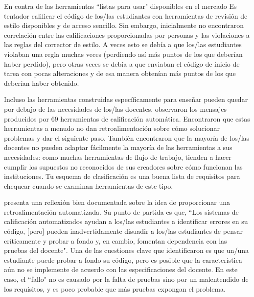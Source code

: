 \begin{aside}{En contra de las herramientas ``listas para usar" disponibles en el mercado}
Es tentador calificar el código de los/las estudiantes con herramientas de revisión de estilo disponibles y de acceso sencillo.
Sin embargo,
\cite{Nutb2016} inicialmente no encontraron correlación entre las calificaciones proporcionadas por personas 
y las violaciones a las reglas del corrector de estilo.
A veces esto se debía a que los/las estudiantes violaban una regla muchas veces 
(perdiendo así más puntos de los que deberían haber perdido), 
pero otras veces se debía a que enviaban el código de inicio de tarea con pocas alteraciones y de esa manera obtenían más puntos de los que deberían haber obtenido.

 Incluso las herramientas construidas específicamente para enseñar pueden quedar por debajo de las necesidades de los/las docentes.
   \cite{Keun2016a,Keun2016b} observaron los mensajes producidos por 69 herramientas de calificación automática.
  Encontraron que estas herramientas a menudo no dan retroalimentación sobre cómo solucionar problemas y dar el siguiente paso.
    También encontraron que la mayoría de los/las docentes no pueden adaptar fácilmente la mayoría de las herramientas a sus necesidades: 
como muchas herramientas de flujo de trabajo, tienden a hacer cumplir los supuestos no reconocidos de sus creadores sobre cómo funcionan las instituciones.
  Tu esquema de clasificación es una buena lista de requisitos para chequear cuando se examinan herramientas de este tipo.
\end{aside}

\cite{Buff2015} presenta una reflexión bien documentada sobre la idea de proporcionar una retroalimentación automatizada.
Su punto de partida es que, 
``Los sistemas de calificación automatizados ayudan a los/las estudiantes a identificar errores en su código, 
[pero] pueden inadvertidamente disuadir a los/las estudiantes de pensar críticamente y probar a fondo y, en cambio,  
fomentan dependencia con las pruebas del docente".
Una de las cuestiones clave que identificaron es que un/una estudiante puede probar a fondo su código, pero es posible que la característica aún no se implemente de acuerdo con las especificaciones del docente.
En este caso, 
el ``fallo" no es causado por la falta de pruebas sino por un malentendido de los requisitos, y es poco probable que más pruebas expongan el problema.

